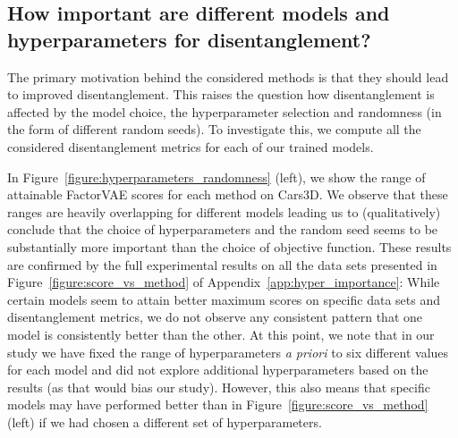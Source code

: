 \documentclass{article}
\begin{document}
\subsection{How important are different models and hyperparameters for disentanglement?}\label{sec:hyper_seed_importance}

The primary motivation behind the considered methods is that they should lead to improved disentanglement.
This raises the question how disentanglement is affected by the model choice, the hyperparameter selection and randomness (in the form of different random seeds).
To investigate this, we compute all the considered disentanglement metrics for each of our trained models.

In Figure~\ref{figure:hyperparameters_randomness} (left), we show the range of attainable FactorVAE scores for each method on Cars3D.
We observe that these ranges are heavily overlapping for different models leading us to (qualitatively) conclude that the choice of hyperparameters and the random seed seems to be substantially more important than the choice of objective function. 
These results are confirmed by the full experimental results on all the data sets presented in Figure~\ref{figure:score_vs_method} of Appendix~\ref{app:hyper_importance}:
While certain models seem to attain better maximum scores on specific data sets and disentanglement metrics, we do not observe any consistent pattern that one model is consistently better than the other.
At this point, we note that in our study we have fixed the range of hyperparameters \emph{a priori} to six different values for each model and did not explore additional hyperparameters based on the results (as that would bias our study).
However, this also means that specific models may have performed better than in Figure~\ref{figure:score_vs_method} (left) if we had chosen a different set of hyperparameters.
\end{document}
